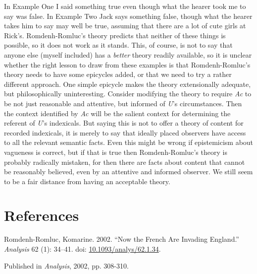 \documentclass[
  10pt,
  letterpaper,
  DIV=11,
  numbers=noendperiod,
  twoside]{scrartcl}
\newlength{\cslhangindent}
\newenvironment{CSLReferences}[2] %
 {\begin{list}{}{%
  \setlength{\itemindent}{0pt}
  \setlength{\leftmargin}{0pt}
  \setlength{\parsep}{0pt}
  \ifodd #1
   \setlength{\leftmargin}{\cslhangindent}
   \setlength{\itemindent}{-1\cslhangindent}
  \fi
  \setlength{\itemsep}{#2\baselineskip}}}
 {\end{list}}
\begin{document}
In Example One I said something true even though what the hearer took me
to say was false. In Example Two Jack says something false, though what
the hearer takes him to say may well be true, assuming that there are a
lot of cute girls at Rick's. Romdenh-Romluc's theory predicts that
neither of these things is possible, so it does not work as it stands.
This, of course, is not to say that anyone else (myself included) has a
\emph{better} theory readily available, so it is unclear whether the
right lesson to draw from these examples is that Romdenh-Romluc's theory
needs to have some epicycles added, or that we need to try a rather
different approach. One simple epicycle makes the theory extensionally
adequate, but philosophically uninteresting. Consider modifying the
theory to require \emph{Ac} to be not just reasonable and attentive, but
informed of \emph{U}'s circumstances. Then the context identified by
\emph{Ac} will be the salient context for determining the referent of
\emph{U}'s indexicals. But saying this is not to offer a theory of
content for recorded indexicals, it is merely to say that ideally placed
observers have access to all the relevant semantic facts. Even this
might be wrong if epistemicism about vagueness is correct, but if that
is true then Romdenh-Romluc's theory is probably radically mistaken, for
then there are facts about content that cannot be reasonably believed,
even by an attentive and informed observer. We still seem to be a fair
distance from having an acceptable theory.

\section*{References}\label{references}

\label{refs}
\begin{CSLReferences}{1}{0}
Romdenh-Romluc, Komarine. 2002. {``Now the French Are Invading
England.''} \emph{Analysis} 62 (1): 34--41. doi:
\href{https://doi.org/10.1093/analys/62.1.34}{10.1093/analys/62.1.34}.

\end{CSLReferences}



\noindent Published in\emph{
Analysis}, 2002, pp. 308-310.
\end{document}
